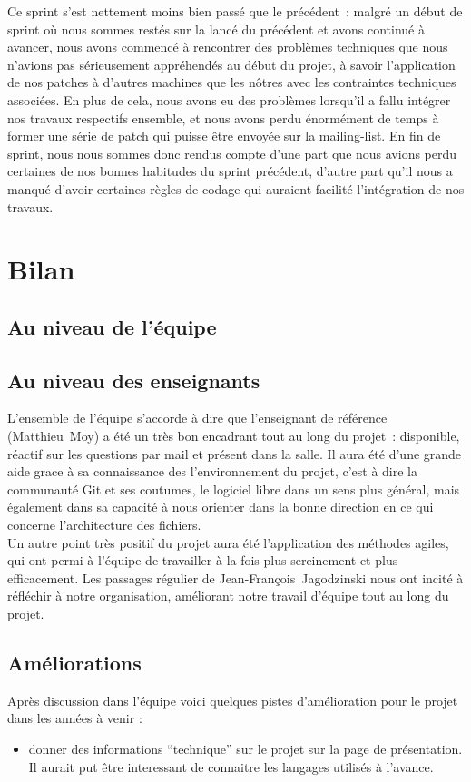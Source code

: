 \documentclass[11pt]{article}
\begin{document}
  Ce sprint s'est nettement moins bien passé que le précédent~: malgré
  un début de sprint où nous sommes restés sur la lancé du précédent et
  avons continué à avancer, nous avons commencé à rencontrer des
  problèmes techniques que nous n'avions pas sérieusement appréhendés au
  début du projet, à savoir l'application de nos patches à d'autres
  machines que les nôtres avec les contraintes techniques
  associées. En plus de cela, nous avons eu des problèmes lorsqu'il a
  fallu intégrer nos travaux respectifs ensemble, et nous avons perdu
  énormément de temps à former une série de patch qui puisse être
  envoyée sur la mailing-list. En fin de sprint, nous nous sommes donc
  rendus compte d'une part que nous avions perdu certaines de nos bonnes
  habitudes du sprint précédent, d'autre part qu'il nous a manqué
  d'avoir certaines règles de codage qui auraient facilité l'intégration
  de nos travaux.

  \section{Bilan}

  \subsection*{Au niveau de l'équipe}

  \subsection*{Au niveau des enseignants}

  L'ensemble de l'équipe s'accorde à dire que l'enseignant de
  référence (Matthieu~Moy) a été un très bon encadrant tout au long du
  projet~: disponible, réactif sur les questions par mail et présent
  dans la salle. Il aura été d'une grande aide grace à sa connaissance
  des l'environnement du projet, c'est à dire la communauté Git et ses
  coutumes, le logiciel libre dans un sens plus général, mais
  également dans sa capacité à nous orienter dans la bonne direction
  en ce qui concerne l'architecture des fichiers.
  \\
  Un autre point très positif du projet aura été l'application des
  méthodes agiles, qui ont permi à l'équipe de travailler à la fois plus
  sereinement et plus efficacement. Les passages régulier de
  Jean-François~Jagodzinski nous ont incité à réfléchir à notre
  organisation, améliorant notre travail d'équipe tout au long du projet.

  \subsection*{Améliorations}

  Après discussion dans l'équipe voici quelques pistes d'amélioration pour le projet dans les années à venir : 

  \begin{itemize}
  \item donner des informations ``technique'' sur le projet sur la page de présentation. Il aurait put être interessant de connaitre les langages utilisés à l'avance. 
  \end{itemize}
\end{document}
